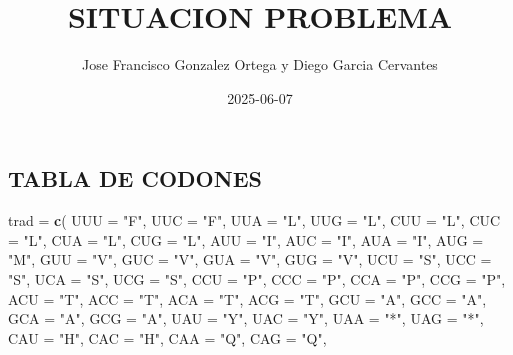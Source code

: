 \documentclass[
]{article}
\title{SITUACION PROBLEMA}
\author{Jose Francisco Gonzalez Ortega y Diego Garcia Cervantes}
\date{2025-06-07}
\newenvironment{Shaded}{\begin{snugshade}}{\end{snugshade}}
\newcommand{\AttributeTok}[1]{\textcolor[rgb]{0.13,0.29,0.53}{#1}}
\newcommand{\FunctionTok}[1]{\textcolor[rgb]{0.13,0.29,0.53}{\textbf{#1}}}
\newcommand{\NormalTok}[1]{#1}
\newcommand{\OtherTok}[1]{\textcolor[rgb]{0.56,0.35,0.01}{#1}}
\newcommand{\StringTok}[1]{\textcolor[rgb]{0.31,0.60,0.02}{#1}}
\begin{document}
\maketitle

\subsection{TABLA DE CODONES}\label{tabla-de-codones}

\begin{Shaded}
\begin{Highlighting}[]
\NormalTok{trad }\OtherTok{=} \FunctionTok{c}\NormalTok{(}
  \AttributeTok{UUU =} \StringTok{"F"}\NormalTok{, }\AttributeTok{UUC =} \StringTok{"F"}\NormalTok{, }\AttributeTok{UUA =} \StringTok{"L"}\NormalTok{, }\AttributeTok{UUG =} \StringTok{"L"}\NormalTok{,}
  \AttributeTok{CUU =} \StringTok{"L"}\NormalTok{, }\AttributeTok{CUC =} \StringTok{"L"}\NormalTok{, }\AttributeTok{CUA =} \StringTok{"L"}\NormalTok{, }\AttributeTok{CUG =} \StringTok{"L"}\NormalTok{,}
  \AttributeTok{AUU =} \StringTok{"I"}\NormalTok{, }\AttributeTok{AUC =} \StringTok{"I"}\NormalTok{, }\AttributeTok{AUA =} \StringTok{"I"}\NormalTok{, }\AttributeTok{AUG =} \StringTok{"M"}\NormalTok{,}
  \AttributeTok{GUU =} \StringTok{"V"}\NormalTok{, }\AttributeTok{GUC =} \StringTok{"V"}\NormalTok{, }\AttributeTok{GUA =} \StringTok{"V"}\NormalTok{, }\AttributeTok{GUG =} \StringTok{"V"}\NormalTok{,}
  \AttributeTok{UCU =} \StringTok{"S"}\NormalTok{, }\AttributeTok{UCC =} \StringTok{"S"}\NormalTok{, }\AttributeTok{UCA =} \StringTok{"S"}\NormalTok{, }\AttributeTok{UCG =} \StringTok{"S"}\NormalTok{,}
  \AttributeTok{CCU =} \StringTok{"P"}\NormalTok{, }\AttributeTok{CCC =} \StringTok{"P"}\NormalTok{, }\AttributeTok{CCA =} \StringTok{"P"}\NormalTok{, }\AttributeTok{CCG =} \StringTok{"P"}\NormalTok{,}
  \AttributeTok{ACU =} \StringTok{"T"}\NormalTok{, }\AttributeTok{ACC =} \StringTok{"T"}\NormalTok{, }\AttributeTok{ACA =} \StringTok{"T"}\NormalTok{, }\AttributeTok{ACG =} \StringTok{"T"}\NormalTok{,}
  \AttributeTok{GCU =} \StringTok{"A"}\NormalTok{, }\AttributeTok{GCC =} \StringTok{"A"}\NormalTok{, }\AttributeTok{GCA =} \StringTok{"A"}\NormalTok{, }\AttributeTok{GCG =} \StringTok{"A"}\NormalTok{,}
  \AttributeTok{UAU =} \StringTok{"Y"}\NormalTok{, }\AttributeTok{UAC =} \StringTok{"Y"}\NormalTok{, }\AttributeTok{UAA =} \StringTok{"*"}\NormalTok{, }\AttributeTok{UAG =} \StringTok{"*"}\NormalTok{,}
  \AttributeTok{CAU =} \StringTok{"H"}\NormalTok{, }\AttributeTok{CAC =} \StringTok{"H"}\NormalTok{, }\AttributeTok{CAA =} \StringTok{"Q"}\NormalTok{, }\AttributeTok{CAG =} \StringTok{"Q"}\NormalTok{,}

\end{Highlighting}
\end{Shaded}
\end{document}
